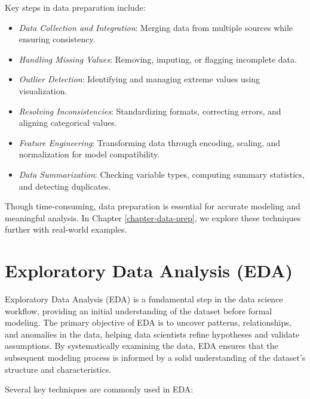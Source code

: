 \documentclass[
]{book}
\providecommand{\tightlist}{%
  \setlength{\itemsep}{0pt}\setlength{\parskip}{0pt}}
\theoremstyle{definition}
\theoremstyle{definition}
\theoremstyle{definition}
\theoremstyle{definition}
\theoremstyle{remark}
\begin{document}
Key steps in data preparation include:

\begin{itemize}
\tightlist
\item
  \emph{Data Collection and Integration}: Merging data from multiple sources while ensuring consistency.\\
\item
  \emph{Handling Missing Values}: Removing, imputing, or flagging incomplete data.\\
\item
  \emph{Outlier Detection}: Identifying and managing extreme values using visualization.\\
\item
  \emph{Resolving Inconsistencies}: Standardizing formats, correcting errors, and aligning categorical values.\\
\item
  \emph{Feature Engineering}: Transforming data through encoding, scaling, and normalization for model compatibility.\\
\item
  \emph{Data Summarization}: Checking variable types, computing summary statistics, and detecting duplicates.
\end{itemize}

Though time-consuming, data preparation is essential for accurate modeling and meaningful analysis. In Chapter \ref{chapter-data-prep}, we explore these techniques further with real-world examples.

\section{Exploratory Data Analysis (EDA)}\label{exploratory-data-analysis-eda}

Exploratory Data Analysis (EDA) is a fundamental step in the data science workflow, providing an initial understanding of the dataset before formal modeling. The primary objective of EDA is to uncover patterns, relationships, and anomalies in the data, helping data scientists refine hypotheses and validate assumptions. By systematically examining the data, EDA ensures that the subsequent modeling process is informed by a solid understanding of the dataset's structure and characteristics.

Several key techniques are commonly used in EDA:
\end{document}
